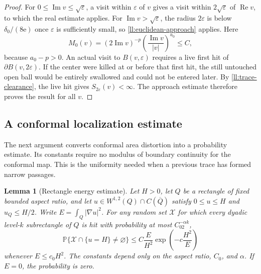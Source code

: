 \documentclass[11pt]{article}
\newtheorem{lemma}[theorem]{Lemma}
\theoremstyle{definition}
\theoremstyle{remark}
\numberwithin{equation}{section}
\begin{document}
\begin{proof}
For $0\le\operatorname{Im}v\le\sqrt\varepsilon$, a visit within
$\varepsilon$ of $v$ gives a visit within $2\sqrt\varepsilon$ of
$\operatorname{Re}v$, to which the real estimate applies.
For $\operatorname{Im}v>\sqrt\varepsilon$, the radius $2\varepsilon$
is below $\delta_0/(8\mathrm e)$ once $\varepsilon$ is sufficiently
small, so \eqref{ll:euclidean-approach} applies. Here
\[
 M_0(v)=(2\operatorname{Im}v)^{-p}
             \left(\frac{\operatorname{Im}v}{|v|}\right)^{a_0}
 \le C,
\]
because $a_0-p>0$.
An actual visit to $B(v,\varepsilon)$ requires a live first hit of
$\partial B(v,2\varepsilon)$.  If the center were killed at or before
that first hit, the still untouched open ball would be entirely swallowed
and could not be entered later.  By \eqref{ll:trace-clearance}, the live
hit gives $S_{2\varepsilon}(v)<\infty$.  The approach estimate therefore
proves the result for all $v$.
\end{proof}

\subsection{A conformal localization estimate}

The next argument converts conformal area distortion into a
probability estimate. Its constants require no modulus of boundary
continuity for the conformal map. This is the uniformity needed
when a previous trace has formed narrow passages.

\begin{lemma}[Rectangle energy estimate]\label{ll:rectangle}
Let $H>0$, let $Q$ be a rectangle of fixed bounded aspect ratio, and let
$u\in W^{1,2}(Q)\cap C(\overline Q)$ satisfy $0\le u\le H$
and $u_Q\le H/2$. Write $E=\int_Q|\nabla u|^2$.
For any random set $\mathcal X$ for which every dyadic level-$k$
subrectangle of $Q$ is hit with probability at most $C_02^{-\alpha k}$,
\[
 \mathbb P\{\mathcal X\cap\{u=H\}\ne\varnothing\}
 \le C\frac E{H^2}\exp\left(-c\frac{H^2}{E}\right)
\]
whenever $E\le c_0H^2$. The constants depend only on the aspect
ratio, $C_0$, and $\alpha$. If $E=0$, the probability is zero.
\end{lemma}
\end{document}

